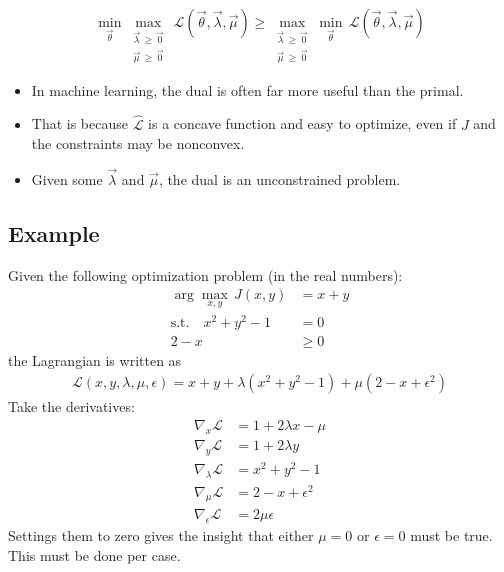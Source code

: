			\begin{equation}
				\min_{\vec{\theta}} \max_{\substack{\vec{\lambda} \,\geq\, \vec{0} \\ \vec{\mu} \,\geq\, \vec{0}}} \, \mathcal{L}(\vec{\theta}, \vec{\lambda}, \vec{\mu}) \geq \max_{\substack{\vec{\lambda} \,\geq\, \vec{0} \\ \vec{\mu} \,\geq\, \vec{0}}} \min_{\vec{\theta}} \, \mathcal{L}(\vec{\theta}, \vec{\lambda}, \vec{\mu})
			\end{equation}
			\begin{itemize}
				\item In machine learning, the dual is often far more useful than the primal.
				\item That is because \(\hat{\mathcal{L}}\) is a concave function and easy to optimize, even if \(J\) and the constraints may be nonconvex.
				\item Given some \(\vec{\lambda}\) and \(\vec{\mu}\), the dual is an unconstrained problem.
			\end{itemize}

		\subsection{Example}
			Given the following optimization problem (in the real numbers):
			\begin{align}
				\arg\max\limits_{x, y} \, J(x, y) & = x + y \\
				\textrm{s.t.} \quad
				x^2 + y^2 - 1                     & = 0     \\
				2 - x                             & \geq 0
			\end{align}
			the Lagrangian is written as
			\begin{align}
				\mathcal{L}(x, y, \lambda, \mu, \epsilon) = x + y + \lambda (x^2 + y^2 - 1) + \mu (2 - x + \epsilon^2)
			\end{align}
			Take the derivatives:
			\begin{align}
				\nabla_x \mathcal{L}        & = 1 + 2 \lambda x - \mu \\
				\nabla_y \mathcal{L}        & = 1 + 2 \lambda y       \\
				\nabla_\lambda \mathcal{L}  & = x^2 + y^2 - 1         \\
				\nabla_\mu \mathcal{L}      & = 2 - x + \epsilon^2    \\
				\nabla_\epsilon \mathcal{L} & = 2\mu\epsilon
			\end{align}
			Settings them to zero gives the insight that either \( \mu = 0 \) or \( \epsilon = 0 \) must be true. This must be done per case.

